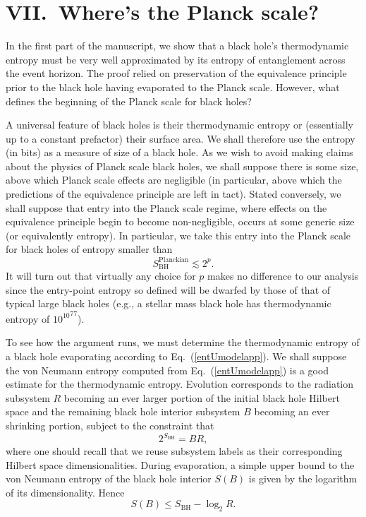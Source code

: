 \documentclass[twocolumn,aps,showpacs,prl]{revtex4}
\begin{document}
\section{VII.\ Where's the Planck scale?}

In the first part of the manuscript, we show that a black hole's
thermodynamic entropy must be very well approximated by its
entropy of entanglement across the event horizon. The proof relied
on preservation of the equivalence principle prior to the black hole
having evaporated to the Planck scale. However, what defines the
beginning of the Planck scale for black holes? 

A universal feature of black holes is their thermodynamic entropy or
(essentially up to a constant prefactor) their surface area. We shall
therefore use the entropy (in bits) as a measure of size of a black hole.
As we wish to avoid making claims about the physics of Planck scale
black holes, we shall suppose there is some size, above which Planck
scale effects are negligible (in particular, above which the predictions
of the equivalence principle are left in tact). Stated conversely,
we shall suppose that entry into the Planck scale regime, where effects
on the equivalence principle begin to become non-negligible, occurs at
some generic size (or equivalently entropy). In particular, we take this
entry into the Planck scale for black holes of entropy smaller than
\begin{equation}
S_{\text{BH}}^{\text{Planckian}} \lesssim 2^p.
\label{entry}
\end{equation}
It will turn out that virtually any choice for $p$ makes no difference
to our analysis since the entry-point entropy so defined will be
dwarfed by those of that of typical large black holes (e.g.,
a stellar mass black hole has thermodynamic entropy of ${10^{10}}^{77}$).

To see how the argument runs, we must determine the thermodynamic entropy
of a black hole evaporating according to Eq.~(\ref{entUmodelapp}). We shall
suppose the von Neumann entropy computed from Eq.~(\ref{entUmodelapp}) is
a good estimate for the thermodynamic entropy. Evolution corresponds to
the radiation subsystem $R$ becoming an ever larger portion of the
initial black hole Hilbert space and the remaining black hole interior 
subsystem $B$ becoming an ever shrinking portion, subject to the 
constraint that
\begin{equation}
2^{S_{\text{BH}}}=BR,
\end{equation}
where one should recall that we reuse subsystem labels as their 
corresponding Hilbert space dimensionalities. During evaporation, a
simple upper bound to the von Neumann entropy of the black hole interior
$S(B)$ is given by the logarithm of its dimensionality. Hence
\begin{equation}
S(B)\leq S_{\text{BH}} -\log_2 R.
\end{equation}
\end{document}
